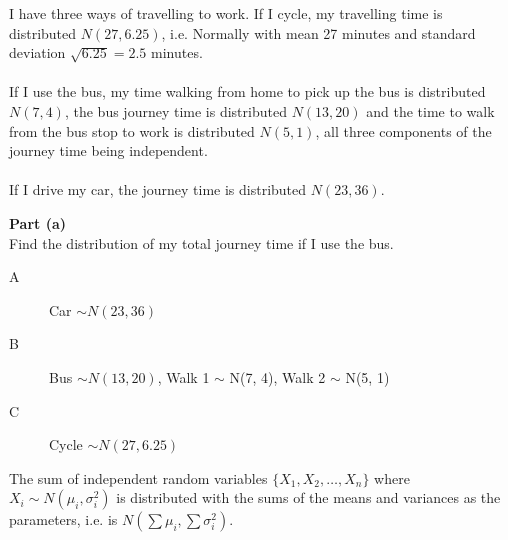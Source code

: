 \documentclass[a4paper,12pt]{article}
\begin{document}
	\begin{framed}
		\large 
		\noindent I have three ways of travelling to work. If I cycle, my travelling time is distributed
		$N(27, 6.25)$, i.e. Normally with mean 27 minutes and standard deviation $\sqrt{6.25} = 2.5$
		minutes. \\ \\
		\large 
		If I use the bus, my time walking from home to pick up the bus is distributed
		$N(7, 4)$, the bus journey time is distributed $N(13, 20)$ and the time to walk from the
		bus stop to work is distributed $N(5, 1)$, all three components of the journey time being
		independent. \\ \\
		\large 
		If I drive my car, the journey time is distributed $N(23, 36)$.
	\end{framed}
	\medskip
	\begin{framed}
		\large
		\noindent \textbf{Part (a)}\\ \large 
		Find the distribution of my total journey time if I use the bus.
	\end{framed}
	
	
	\begin{description}
		\item[A] Car $\sim N(23, 36)$
		\item[B] Bus $\sim N(13, 20)$, Walk 1 $\sim$ N(7, 4), Walk 2 $\sim$ N(5, 1)
		\item[C] Cycle $\sim N(27, 6.25)$
	\end{description}
	\large 
	\begin{framed}
		\large
		\noindent The sum of independent random variables $\{X_1,X_2,\ldots,X_n\}$ where $X_i \sim N( \mu_i, \sigma^2_i)$ is distributed with the sums of the means and variances as the parameters, i.e. is $N(\sum \mu_i, \sum\sigma^2_i)$.
	\end{framed}
	
\end{document}
